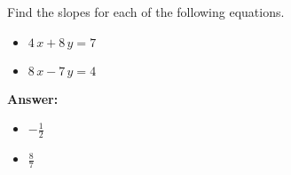  Find the slopes for each of the following equations. \begin{itemize}\item \( 4 \, x + 8 \, y = 7 \)\item \( 8 \, x - 7 \, y = 4 \)\end{itemize}

        \textbf{Answer:} \begin{itemize}\item \( -\frac{1}{2} \)\item \( \frac{8}{7} \)\end{itemize}
